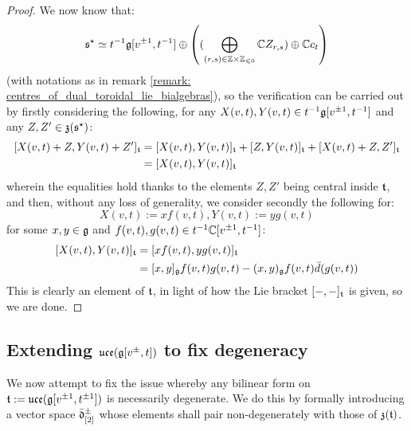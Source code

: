                 \begin{proof}
                    We now know that:
                        $$\s^{\star} \cong t^{-1}\g[v^{\pm 1}, t^{-1}] \oplus \left( ( \bigoplus_{(r, s) \in \Z \x \Z_{\leq 0}} \bbC Z_{r, s}) \oplus \bbC c_t \right)$$
                    (with notations as in remark \ref{remark: centres_of_dual_toroidal_lie_bialgebras}), so the verification can be carried out by firstly considering the following, for any $X(v, t), Y(v, t) \in t^{-1}\mathfrak{g}[v^{\pm 1}, t^{-1}]$ and any $Z, Z' \in \mathfrak{z}(\mathfrak{s}^{\star})$:
                        $$
                            \begin{aligned}
                                [ X(v, t) + Z, Y(v, t) + Z' ]_{\t} & = [ X(v, t), Y(v, t) ]_{\t} + [ Z, Y(v, t) ]_{\t} + [X(v, t) + Z, Z']_{\t}
                                \\
                                & = [ X(v, t), Y(v, t) ]_{\t}
                            \end{aligned}
                        $$
                    wherein the equalities hold thanks to the elements $Z, Z'$ being central inside $\mathfrak{t}$, and then, without any loss of generality, we consider secondly the following for:
                        $$X(v, t) := x f(v, t), Y(v, t) := y g(v, t)$$
                    for some $x, y \in \mathfrak{g}$ and $f(v, t), g(v, t) \in t^{-1}\mathbb{C}[v^{\pm 1}, t^{-1}]$:
                        $$
                            \begin{aligned}
                                [ X(v, t), Y(v, t) ]_{\t} & = [ x f(v, t), y g(v, t) ]_{\t}
                                \\
                                & = [x, y]_{\g} f(v, t) g(v, t) - (x, y)_{\g} f(v, t) \bar{d}( g(v, t) )
                            \end{aligned}
                        $$
                    This is clearly an element of $\mathfrak{t}$, in light of how the Lie bracket $[-, -]_{\mathfrak{t}}$ is given, so we are done. 
                \end{proof}

        \subsection{Extending \texorpdfstring{$ \mathfrak{uce}(\mathfrak{g}[v^{\pm}, t]) $}{} to fix degeneracy}
            We now attempt to fix the issue whereby any bilinear form on $\mathfrak{t} := \mathfrak{uce}(\mathfrak{g}[v^{\pm 1}, t^{\pm 1}])$ is necessarily degenerate. We do this by formally introducing a  vector space $\bar{\mathfrak{d}}_{[2]}^{\pm}$ whose elements shall pair non-degenerately with those of $\mathfrak{z}(\mathfrak{t})$. 

